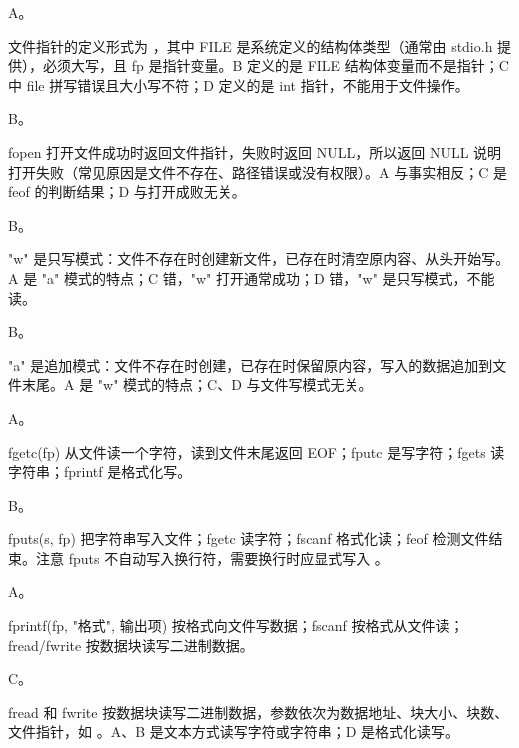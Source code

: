 \documentclass[a4paper,11pt]{article}
\begin{document}


\q A。\begin{analysis}文件指针的定义形式为 ，其中 FILE 是系统定义的结构体类型（通常由 stdio.h 提供），必须大写，且 fp 是指针变量。B 定义的是 FILE 结构体变量而不是指针；C 中 file 拼写错误且大小写不符；D 定义的是 int 指针，不能用于文件操作。\end{analysis}

\q B。\begin{analysis}fopen 打开文件成功时返回文件指针，失败时返回 NULL，所以返回 NULL 说明打开失败（常见原因是文件不存在、路径错误或没有权限）。A 与事实相反；C 是 feof 的判断结果；D 与打开成败无关。\end{analysis}

\q B。\begin{analysis}"w" 是只写模式：文件不存在时创建新文件，已存在时清空原内容、从头开始写。A 是 "a" 模式的特点；C 错，"w" 打开通常成功；D 错，"w" 是只写模式，不能读。\end{analysis}

\q B。\begin{analysis}"a" 是追加模式：文件不存在时创建，已存在时保留原内容，写入的数据追加到文件末尾。A 是 "w" 模式的特点；C、D 与文件写模式无关。\end{analysis}

\q A。\begin{analysis}fgetc(fp) 从文件读一个字符，读到文件末尾返回 EOF；fputc 是写字符；fgets 读字符串；fprintf 是格式化写。\end{analysis}

\q B。\begin{analysis}fputs(s, fp) 把字符串写入文件；fgetc 读字符；fscanf 格式化读；feof 检测文件结束。注意 fputs 不自动写入换行符，需要换行时应显式写入 。\end{analysis}

\q A。\begin{analysis}fprintf(fp, "格式", 输出项) 按格式向文件写数据；fscanf 按格式从文件读；fread/fwrite 按数据块读写二进制数据。\end{analysis}

\q C。\begin{analysis}fread 和 fwrite 按数据块读写二进制数据，参数依次为数据地址、块大小、块数、文件指针，如 。A、B 是文本方式读写字符或字符串；D 是格式化读写。\end{analysis}
\end{document}
